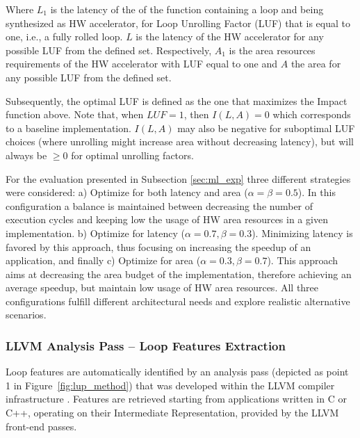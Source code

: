 \documentclass[]{usiinfthesis}
\begin{document}
Where $L_1$ is the latency of the of the function containing a loop and being synthesized as HW 
accelerator, for Loop Unrolling Factor (LUF) that is equal to one, i.e., a fully rolled loop. $L$ 
is the latency of the HW accelerator for any possible LUF from the defined set.
Respectively, $A_1$ is the area resources requirements of the HW accelerator with LUF equal to one and 
$A$ the area for any possible LUF from the defined set.\par

Subsequently, the optimal LUF is defined as the one that maximizes the Impact function above. Note that, 
when $LUF = 1$, then $I(L,A)=0$ which corresponds to a baseline implementation. $I(L,A)$ may also 
be negative for suboptimal LUF choices (where unrolling might increase area without decreasing 
latency), but will always be $\ge 0$ for optimal unrolling factors.\par


For the evaluation presented in Subsection \ref{sec:ml_exp}
three different strategies were considered: a) Optimize for both latency and area ($\alpha = 
\beta = 0.5$). In this configuration a balance is maintained between decreasing the number of 
execution cycles and keeping low the usage of HW area resources in a given implementation.
b) Optimize for latency ($\alpha = 0.7, \beta = 0.3$). Minimizing latency is favored by this
approach, thus focusing on increasing the speedup of an application, and finally c) Optimize
for area ($\alpha = 0.3, \beta = 0.7$). This approach aims at decreasing the area budget of 
the implementation, therefore achieving an average speedup, but maintain low usage of HW 
area resources. All three configurations fulfill different architectural needs and explore 
realistic alternative scenarios.\par



\subsubsection{LLVM Analysis Pass -- Loop Features Extraction}

Loop features are automatically identified by an analysis pass (depicted as 
point 1 in Figure~\ref{fig:lup_method}) that was developed within the LLVM 
compiler infrastructure \cite{LattnerMar04}. Features are retrieved starting from
applications written in C or C++, operating on their Intermediate
Representation, provided by the LLVM front-end passes.\par  
\end{document}
